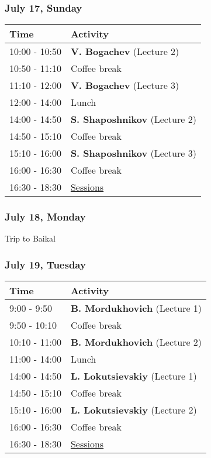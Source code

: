 \documentclass[
]{article}
\begin{document}
\hypertarget{july-17-sunday}{%
\subsubsection{July 17, Sunday}\label{july-17-sunday}}

\begin{longtable}[]{@{}ll@{}}
\toprule()
Time & Activity \\
\midrule()
\endhead
10:00 - 10:50 & \textbf{V. Bogachev} (Lecture 2) \\
10:50 - 11:10 & Coffee break \\
11:10 - 12:00 & \textbf{V. Bogachev} (Lecture 3) \\
12:00 - 14:00 & Lunch \\
14:00 - 14:50 & \textbf{S. Shaposhnikov} (Lecture 2) \\
14:50 - 15:10 & Coffee break \\
15:10 - 16:00 & \textbf{S. Shaposhnikov} (Lecture 3) \\
16:00 - 16:30 & Coffee break \\
16:30 - 18:30 & \protect\hyperlink{se}{Sessions} \\
\bottomrule()
\end{longtable}

\hypertarget{july-18-monday}{%
\subsubsection{July 18, Monday}\label{july-18-monday}}

Trip to Baikal

\hypertarget{july-19-tuesday}{%
\subsubsection{July 19, Tuesday}\label{july-19-tuesday}}

\begin{longtable}[]{@{}ll@{}}
\toprule()
Time & Activity \\
\midrule()
\endhead
9:00 - 9:50 & \textbf{B. Mordukhovich} (Lecture 1) \\
9:50 - 10:10 & Coffee break \\
10:10 - 11:00 & \textbf{B. Mordukhovich} (Lecture 2) \\
11:00 - 14:00 & Lunch \\
14:00 - 14:50 & \textbf{L. Lokutsievskiy} (Lecture 1) \\
14:50 - 15:10 & Coffee break \\
15:10 - 16:00 & \textbf{L. Lokutsievskiy} (Lecture 2) \\
16:00 - 16:30 & Coffee break \\
16:30 - 18:30 & \protect\hyperlink{se}{Sessions} \\
\bottomrule()
\end{longtable}
\end{document}
